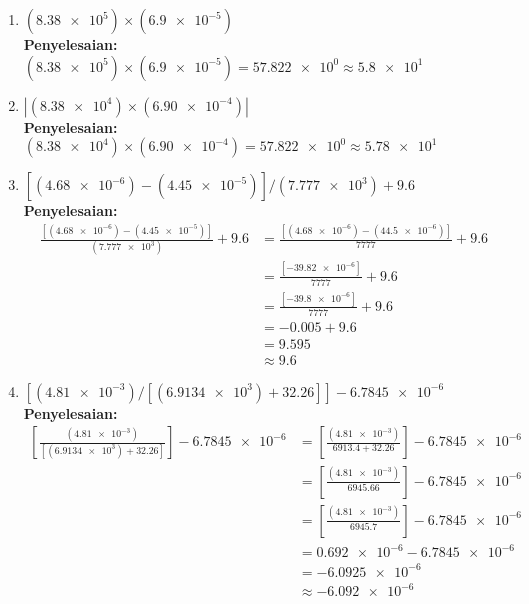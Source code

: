 \documentclass{article}
\newcommand{\penyelesaian}{\textbf{Penyelesaian: }}
\begin{document}
\begin{enumerate}
\begin{enumerate}
        \item $(\num{8,38e5}) \times (\num{6,9e-5})$ \\
        \penyelesaian $(\num{8,38e5}) \times (\num{6,9e-5}) = \num{57,822e0} \approx \num{5,8e1}$

        \item $\left| (\num{8,38e4}) \times (\num{6,90e-4}) \right|$ \\
        \penyelesaian $(\num{8,38e4}) \times (\num{6,90e-4}) = \num{57,822e0} \approx \num{5,78e1}$

        \item $\left[(\num{4,68e-6}) - (\num{4,45e-5})\right] / {(\num{7,777e3})} + \num{9,6}$ \\
        \penyelesaian
        \begin{align*}
            \frac{\left[(\num{4,68e-6}) - (\num{4,45e-5})\right]}{(\num{7,777e3})} + \num{9,6} 
            &= \frac{\left[(\num{4,68e-6}) - (\num{44,5e-6})\right]}{\num{7777}} + \num{9,6} \\
            &= \frac{\left[\num{-39,82e-6}\right]}{\num{7777}} + \num{9,6} \\
            &= \frac{\left[\num{-39,8e-6}\right]}{\num{7777}} + \num{9,6} \\
            &= \num{-0,005} + \num{9,6} \\
            &= \num{9,595} \\
            &\approx \num{9,6}
        \end{align*}

        \item $\left[(\num{4,81e-3})/\left[(\num{6,9134e3}) + \num{32,26}\right]\right] - \num{6,7845e-6}$ \\
        \penyelesaian
        \begin{align*}
            \left[ \frac{(\num{4,81e-3})}{\left[(\num{6,9134e3}) + \num{32,26}\right]} \right] - \num{6,7845e-6}
            &= \left[ \frac{(\num{4,81e-3})}{\num{6913,4} + \num{32,26}} \right] - \num{6,7845e-6} \\
            &= \left[ \frac{(\num{4,81e-3})}{\num{6945,66}} \right] - \num{6,7845e-6} \\
            &= \left[ \frac{(\num{4,81e-3})}{\num{6945,7}} \right] - \num{6,7845e-6} \\
            &= \num{0,692e-6} - \num{6,7845e-6} \\
            &= \num{-6,0925e-6} \\
            &\approx \num{-6,092e-6} \\
        \end{align*}


\end{enumerate}
\end{enumerate}
\end{document}
